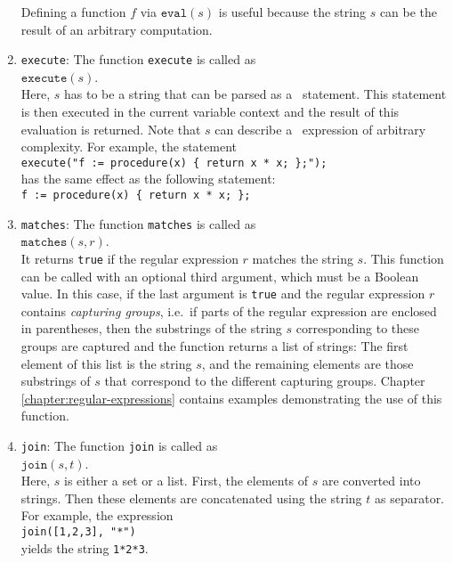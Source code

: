 \begin{enumerate}
      Defining a function $f$ via $\texttt{eval}(s)$ is useful because the string $s$
      can be the result of an arbitrary computation.  
\item \texttt{execute}: The function \texttt{execute}  is called as
      \\[0.2cm]
      \hspace*{1.3cm}
      $\mathtt{execute}(s)$.
      \\[0.2cm]
      Here, $s$ has to be a string that can be parsed as a \setlx\ statement.  This statement
      is then executed in the current variable context and the result of this evaluation is
      returned.   Note that $s$ can describe a \setlx\ expression of arbitrary complexity.
      For example, the statement
      \\[0.2cm]
      \hspace*{1.3cm}
      \texttt{execute("f := procedure(x) \{ return x * x; \};");}
      \\[0.2cm]
      has the same effect as the following statement:
      \\[0.2cm]
      \hspace*{1.3cm}
      \texttt{f := procedure(x) \{ return x * x; \};}
\item \texttt{matches}:  The function \texttt{matches} is called as
      \\[0.2cm]
      \hspace*{1.3cm}
      $\texttt{matches}(s, r)$.
      \\[0.2cm]
      It returns \texttt{true} if the regular expression $r$ matches the string $s$.
      This function can be called with an optional third argument, which must be a Boolean
      value.  In this case, if the last argument is \texttt{true} and the regular
      expression $r$ contains \emph{capturing groups}, i.e.~if parts of the regular
      expression are enclosed in parentheses, then the substrings of the string $s$
      corresponding to these groups are
      captured and the function returns a list of strings:  The first element of this
      list is the string $s$, and the remaining elements are those substrings of $s$ that
      correspond to the different capturing groups.  
      Chapter \ref{chapter:regular-expressions} contains examples demonstrating the use of this function.
      
\item \texttt{join}: The function \texttt{join} is called as
      \\[0.2cm]
      \hspace*{1.3cm}
      $\texttt{join}(s,t)$.
      \\[0.2cm]
      Here, $s$ is either a set or a list.  First, the elements of $s$ are converted into
      strings.  Then these elements are concatenated using the string $t$ as separator.
      For example, the expression
      \\[0.2cm]
      \hspace*{1.3cm}
      \texttt{join([1,2,3], "*")}
      \\[0.2cm]
      yields the string \texttt{1*2*3}.  


\end{enumerate}
